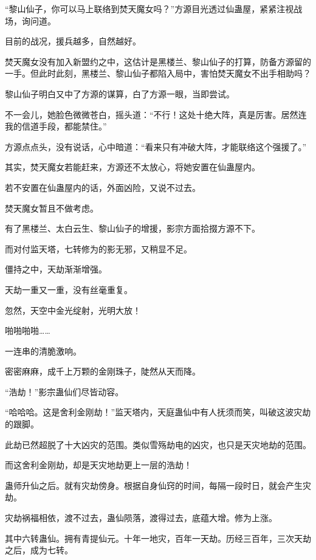 
\begin{this_body}



“黎山仙子，你可以马上联络到焚天魔女吗？”方源目光透过仙蛊屋，紧紧注视战场，询问道。

目前的战况，援兵越多，自然越好。

焚天魔女没有加入新盟约之中，这估计是黑楼兰、黎山仙子的打算，防备方源留的一手。但此时此刻，黑楼兰、黎山仙子都陷入局中，害怕焚天魔女不出手相助吗？

黎山仙子明白又中了方源的谋算，白了方源一眼，当即尝试。

不一会儿，她脸色微微苍白，摇头道：“不行！这处十绝大阵，真是厉害。居然连我的信道手段，都能禁住。”

方源点点头，没有说话，心中暗道：“看来只有冲破大阵，才能联络这个强援了。”

其实，焚天魔女若能赶来，方源还不太放心，将她安置在仙蛊屋内。

若不安置在仙蛊屋内的话，外面凶险，又说不过去。

焚天魔女暂且不做考虑。

有了黑楼兰、太白云生、黎山仙子的增援，影宗方面拾掇方源不下。

而对付监天塔，七转修为的影无邪，又稍显不足。

僵持之中，天劫渐渐增强。

天劫一重又一重，没有丝毫重复。

忽然，天空中金光绽射，光明大放！

啪啪啪啪……

一连串的清脆激响。

密密麻麻，成千上万颗的金刚珠子，陡然从天而降。

“浩劫！”影宗蛊仙们尽皆动容。

“哈哈哈。这是舍利金刚劫！”监天塔内，天庭蛊仙中有人抚须而笑，叫破这波灾劫的跟脚。

此劫已然超脱了十大凶灾的范围。类似雪殇劫电的凶灾，也只是天灾地劫的范围。

而这舍利金刚劫，却是天灾地劫更上一层的浩劫！

蛊师升仙之后。就有灾劫傍身。根据自身仙窍的时间，每隔一段时日，就会产生灾劫。

灾劫祸福相依，渡不过去，蛊仙陨落，渡得过去，底蕴大增。修为上涨。

其中六转蛊仙。拥有青提仙元。十年一地灾，百年一天劫。历经三百年，三次天劫之后，成为七转。


\end{this_body}
